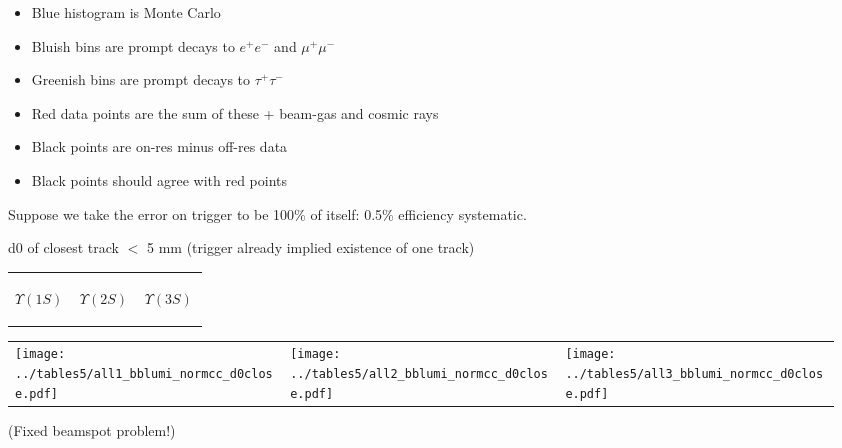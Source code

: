 \documentclass[landscape]{article}
\begin{document}
\begin{itemize}
  \item Blue histogram is Monte Carlo

  \item Bluish bins are prompt decays to $e^+e^-$ and $\mu^+\mu^-$

  \item Greenish bins are prompt decays to $\tau^+\tau^-$

  \item Red data points are the sum of these + beam-gas and cosmic rays

  \item Black points are on-res minus off-res data

  \item Black points should agree with red points
\end{itemize}

\vfill

Suppose we take the error on trigger to be 100\% of itself: 0.5\% efficiency systematic.

\pagebreak

d0 of closest track $<$ 5 mm (trigger already implied existence of one track)

\vspace{-1.75 cm}
\begin{center}
  \begin{tabular}{p{0.32\linewidth} p{0.32\linewidth} p{0.32\linewidth}}
    \begin{center} $\Upsilon(1S)$ \end{center} & \begin{center} $\Upsilon(2S)$ \end{center} & \begin{center} $\Upsilon(3S)$ \end{center} \\
  \end{tabular}

  \vspace{-0.75 cm}
  \begin{tabular}{p{0.32\linewidth} p{0.32\linewidth} p{0.32\linewidth}}
    \texttt{[image: ../tables5/all1\_bblumi\_normcc\_d0close.pdf]} &
    \texttt{[image: ../tables5/all2\_bblumi\_normcc\_d0close.pdf]} &
    \texttt{[image: ../tables5/all3\_bblumi\_normcc\_d0close.pdf]}
  \end{tabular}
\end{center}

(Fixed beamspot problem!)
\end{document}
